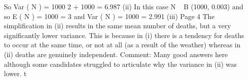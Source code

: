 \documentclass[a4paper,12pt]{article}
\begin{document}
So Var ( N ) = 1000 2  + 1000  = 6.987
(ii)
In this case N ~ B (1000, 0.003) and so
E ( N ) = 1000  = 3
and
Var ( N ) = 1000   = 2.991
(iii)
Page 4
The simplification in (ii) results in the same mean number of deaths, but a
very significantly lower variance.%
This is because in (i) there is a tendency for deaths to occur at the same time,
or not at all (as a result of the weather) whereas in (ii) deaths are genuinely
independent.
Comment: Many good answers here although some candidates struggled to articulate why
the variance in (ii) was lower.
t
\end{document}
